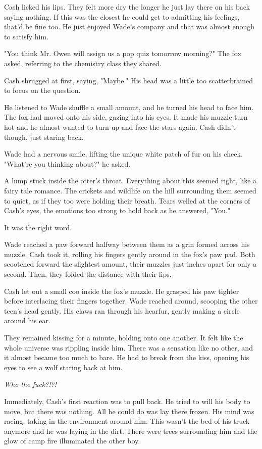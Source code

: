Cash licked his lips. They felt more dry the longer he just lay there on his back saying nothing. If this was the closest he could get to admitting his feelings, that'd be fine too. He just enjoyed Wade's company and that was almost enough to satisfy him.

"You think Mr. Owen will assign us a pop quiz tomorrow morning?" The fox asked, referring to the chemistry class they shared.

Cash shrugged at first, saying, "Maybe." His head was a little too scatterbrained to focus on the question.

He listened to Wade shuffle a small amount, and he turned his head to face him. The fox had moved onto his side, gazing into his eyes. It made his muzzle turn hot and he almost wanted to turn up and face the stars again. Cash didn't though, just staring back.

Wade had a nervous smile, lifting the unique white patch of fur on his cheek. "What're you thinking about?" he asked.

A lump stuck inside the otter's throat. Everything about this seemed right, like a fairy tale romance. The crickets and wildlife on the hill surrounding them seemed to quiet, as if they too were holding their breath. Tears welled at the corners of Cash's eyes, the emotions too strong to hold back as he answered, "You."

It was the right word.

Wade reached a paw forward halfway between them as a grin formed across his muzzle. Cash took it, rolling his fingers gently around in the fox's paw pad. Both scootched forward the slightest amount, their muzzles just inches apart for only a second. Then, they folded the distance with their lips.

Cash let out a small coo inside the fox's muzzle. He grasped his paw tighter before interlacing their fingers together. Wade reached around, scooping the other teen's head gently. His claws ran through his hearfur, gently making a circle around his ear.

They remained kissing for a minute, holding onto one another. It felt like the whole universe was rippling inside him. There was a sensation like no other, and it almost became too much to bare. He had to break from the kiss, opening his eyes to see a wolf staring back at him.

\emph{Who the fuck?!?!}

Immediately, Cash's first reaction was to pull back. He tried to will his body to move, but there was nothing. All he could do was lay there frozen. His mind was racing, taking in the environment around him. This wasn't the bed of his truck anymore and he was laying in the dirt. There were trees surrounding him and the glow of camp fire illuminated the other boy.

